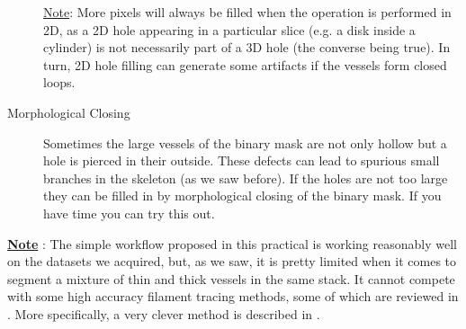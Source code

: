 \begin{description}
\underline{Note}:
More pixels will always be filled when the operation is performed in 2D, as a 2D hole appearing in a particular slice (e.g. a disk inside a cylinder) is not necessarily part of a 3D hole (the converse being true). In turn, 2D hole filling can generate some artifacts if the vessels form closed loops. 

\item[Morphological Closing] Sometimes the large vessels of the binary mask are not only hollow but a hole is pierced in their outside. These defects can lead to spurious small branches in the skeleton (as we saw before). If the holes are not too large they can be filled in by morphological closing of the binary mask. If you have time you can try this out.
\end{description}

\textbf{\underline{Note}} : The simple workflow proposed in this practical is working reasonably well on the datasets we acquired, but, as we saw, it is pretty limited when it comes to segment a mixture of thin and thick vessels in the same stack. It cannot compete with some high accuracy filament tracing methods, some of which are reviewed in \cite{lesage2009review}. More specifically, a very clever method is described in \cite{li2006vessels}.